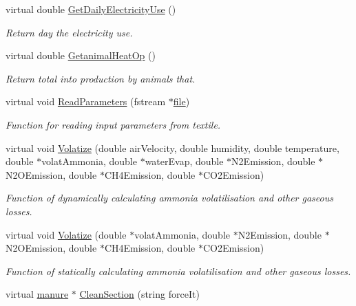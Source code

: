 \begin{DoxyCompactItemize}
virtual double \hyperlink{classanimal_section_ac5e69d491872dc3b57cba2b59ba36cc2}{GetDailyElectricityUse} ()
\begin{DoxyCompactList}\small\item\em Return day the electricity use. \item\end{DoxyCompactList}\item 
virtual double \hyperlink{classanimal_section_ac576524a422ea47bf04918c40d125695}{GetanimalHeatOp} ()
\begin{DoxyCompactList}\small\item\em Return total into production by animals that. \item\end{DoxyCompactList}\item 
virtual void \hyperlink{classanimal_section_afe24791a22d2cbdb189332e1b468f059}{ReadParameters} (fstream $\ast$\hyperlink{classbase_a3af52ee9891719d09b8b19b42450b6f6}{file})
\begin{DoxyCompactList}\small\item\em Function for reading input parameters from textile. \item\end{DoxyCompactList}\item 
virtual void \hyperlink{classanimal_section_a6d35029ed226599d557f1bf61b9100c3}{Volatize} (double airVelocity, double humidity, double temperature, double $\ast$volatAmmonia, double $\ast$waterEvap, double $\ast$N2Emission, double $\ast$N2OEmission, double $\ast$CH4Emission, double $\ast$CO2Emission)
\begin{DoxyCompactList}\small\item\em Function of dynamically calculating ammonia volatilisation and other gaseous losses. \item\end{DoxyCompactList}\item 
virtual void \hyperlink{classanimal_section_a71d57784567fc97647e2b7d4c98bb6d6}{Volatize} (double $\ast$volatAmmonia, double $\ast$N2Emission, double $\ast$N2OEmission, double $\ast$CH4Emission, double $\ast$CO2Emission)
\begin{DoxyCompactList}\small\item\em Function of statically calculating ammonia volatilisation and other gaseous losses. \item\end{DoxyCompactList}\item 
virtual \hyperlink{classmanure}{manure} $\ast$ \hyperlink{classanimal_section_a0e933a3e74bf07c42c444dd7dec4747e}{CleanSection} (string forceIt)

\end{DoxyCompactItemize}
